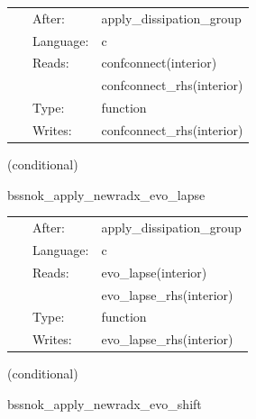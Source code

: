 \documentclass{article}
\begin{document}
\hspace{5mm}

 \begin{tabular*}{160mm}{cll} 
~ & After:  & apply\_dissipation\_group \\ 
~ & Language:  & c \\ 
~ & Reads:  & confconnect(interior) \\ 
~& ~ &confconnect\_rhs(interior)\\ 
~ & Type:  & function \\ 
~ & Writes:  & confconnect\_rhs(interior) \\ 
\end{tabular*} 


\vspace{5mm}

   (conditional) 

\hspace{5mm} bssnok\_apply\_newradx\_evo\_lapse 



\hspace{5mm}

 \begin{tabular*}{160mm}{cll} 
~ & After:  & apply\_dissipation\_group \\ 
~ & Language:  & c \\ 
~ & Reads:  & evo\_lapse(interior) \\ 
~& ~ &evo\_lapse\_rhs(interior)\\ 
~ & Type:  & function \\ 
~ & Writes:  & evo\_lapse\_rhs(interior) \\ 
\end{tabular*} 


\vspace{5mm}

   (conditional) 

\hspace{5mm} bssnok\_apply\_newradx\_evo\_shift 



\hspace{5mm}
\end{document}
